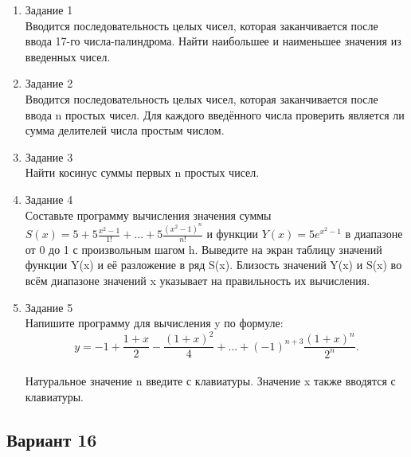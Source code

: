 \documentclass[a4paper]{article}
\begin{document}
	
	\begin{enumerate} 
		\item Задание 1 \\
		Вводится последовательность целых чисел, которая заканчивается после ввода 17-го числа-палиндрома. Найти наибольшее и наименьшее значения из введенных чисел.\\
		\item Задание 2\\
		Вводится последовательность целых чисел, которая заканчивается после ввода n простых чисел. Для каждого введённого числа проверить является ли сумма делителей числа простым числом.\\
		\item Задание 3 \\
		Найти  косинус суммы первых n простых чисел.\\
		\item Задание 4 \\ 
		Составьте программу вычисления значения суммы  $S(x)=5+5\frac{x^2-1}{1!}+...+5\frac{(x^2-1)^n}{n!}$
		и функции $Y(x)=5e^{x^2-1}$ в диапазоне от 0 до 1
		с произвольным шагом h. Выведите на экран таблицу значений функции Y(x) и её разложение в ряд S(x). Близость значений Y(x) и S(x) во всём диапазоне
		значений x указывает на правильность их вычисления.\\
		\item Задание 5 \\
		Напишите программу для вычисления y по формуле:\\
		$$y=-1+\frac{1+x}{2}-\frac{(1+x)^2}{4}+...+(-1)^{n+3}\frac{{(1+x)^n}}{2^n}.$$\\
		Натуральное значение n введите с клавиатуры. Значение x также вводятся с клавиатуры.\\
		
	\end{enumerate}
	
	\begin{center}
		\subsection*{Вариант 16}
	\end{center}
	
\end{document}
